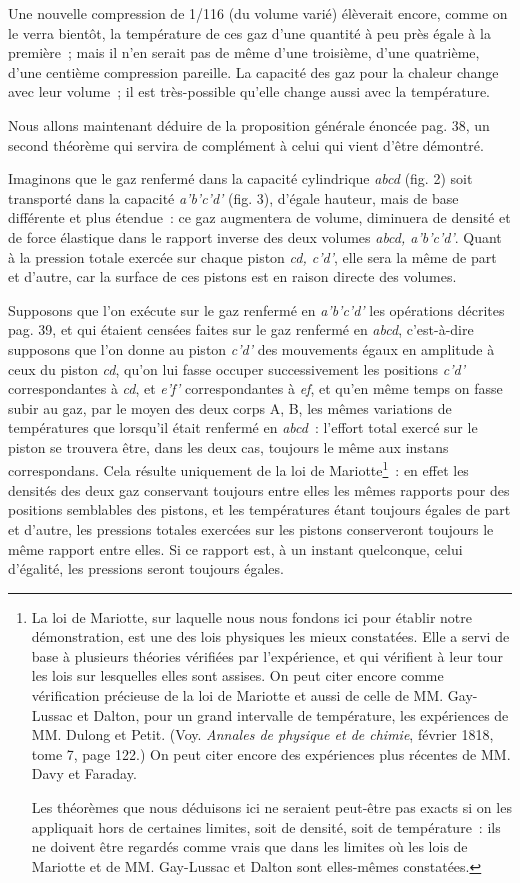 \documentclass[french,twoside]{book} %
\begin{document}
\noindent Une nouvelle compression de 1/116 (du volume varié) élèverait encore, comme on le verra bientôt, la température de ces gaz d’une quantité à peu près égale à la première ; mais il n’en serait pas de même d’une troisième, d’une quatrième, d’une centième compression pareille. La capacité des gaz pour la chaleur change avec leur volume ; il est très-possible qu’elle change aussi avec la température.\par
Nous allons maintenant déduire de la proposition générale énoncée pag. 38, un second théorème qui servira de complément à celui qui vient d’être démontré.\par
Imaginons que le gaz renfermé dans la capacité cylindrique \emph{abcd} (fig. 2) soit transporté dans la capacité \emph{a’b’c’d’} (fig. 3), d’égale hauteur, mais de base différente et plus étendue : ce gaz augmentera de volume, diminuera de densité et de force élastique dans le rapport inverse des deux volumes \emph{abcd, a’b’c’d’}. Quant à la pression totale exercée sur chaque piston \emph{cd, c’d’}, elle sera la même de part et d’autre, car la surface de ces pistons est en raison directe des volumes.\par
Supposons que l’on exécute sur le gaz renfermé en \emph{a’b’c’d’} les opérations décrites pag. 39, et qui étaient censées faites sur le gaz renfermé en \emph{abcd}, c’est-à-dire supposons que l’on donne au piston \emph{c’d’} des mouvements égaux en amplitude à ceux du piston \emph{cd}, qu’on lui fasse occuper successivement les positions \emph{c’d’} correspondantes à \emph{cd}, et \emph{e’f’} correspondantes à \emph{ef}, et qu’en même temps on fasse subir au gaz, par le moyen des deux corps A, B, les mêmes variations de températures que lorsqu’il était renfermé en \emph{abcd} : l’effort total exercé sur le piston se trouvera être, dans les deux cas, toujours le même aux instans correspondans. Cela résulte uniquement de la loi de Mariotte\footnote{ \noindent La loi de Mariotte, sur laquelle nous nous fondons ici pour établir notre démonstration, est une des lois physiques les mieux constatées. Elle a servi de base à plusieurs théories vérifiées par l’expérience, et qui vérifient à leur tour les lois sur lesquelles elles sont assises. On peut citer encore comme vérification précieuse de la loi de Mariotte et aussi de celle de MM. Gay-Lussac et Dalton, pour un grand intervalle de température, les expériences de MM. Dulong et Petit. (Voy. \emph{Annales de physique et de chimie}, février 1818, tome 7, page 122.) On peut citer encore des expériences plus récentes de MM. Davy et Faraday.\par
 Les théorèmes que nous déduisons ici ne seraient peut-être pas exacts si on les appliquait hors de certaines limites, soit de densité, soit de température : ils ne doivent être regardés comme vrais que dans les limites où les lois de Mariotte et de MM. Gay-Lussac et Dalton sont elles-mêmes constatées.
} : en effet les densités des deux gaz conservant toujours entre elles les mêmes rapports pour des positions semblables des pistons, et les températures étant toujours égales de part et d’autre, les pressions totales exercées sur les pistons conserveront toujours le même rapport entre elles. Si ce rapport est, à un instant quelconque, celui d’égalité, les pressions seront toujours égales.\par
\end{document}

